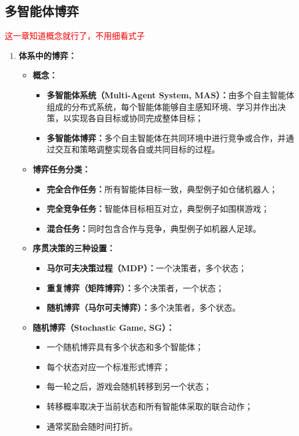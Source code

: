 \documentclass[../main.tex]{subfiles}
\begin{document}
\subsection{多智能体博弈}
\textcolor{red}{这一章知道概念就行了，不用细看式子}
\begin{enumerate}
    \item \textbf{体系中的博弈：}
    \begin{itemize}
        \item \textbf{概念：}
        \begin{itemize}
            \item \textbf{多智能体系统（Multi-Agent System, MAS）：}由多个自主智能体组成的分布式系统，每个智能体能够自主感知环境、学习并作出决策，以实现各自目标或协同完成整体目标；
            \item \textbf{多智能体博弈：}多个自主智能体在共同环境中进行竞争或合作，并通过交互和策略调整实现各自或共同目标的过程。
        \end{itemize}

        \item \textbf{博弈任务分类：}
        \begin{itemize}
            \item \textbf{完全合作任务：}所有智能体目标一致，典型例子如仓储机器人；
            \item \textbf{完全竞争任务：}智能体目标相互对立，典型例子如围棋游戏；
            \item \textbf{混合任务：}同时包含合作与竞争，典型例子如机器人足球。
        \end{itemize}

        \item \textbf{序贯决策的三种设置：}
        \begin{itemize}
            \item \textbf{马尔可夫决策过程（MDP）：}一个决策者，多个状态；
            \item \textbf{重复博弈（矩阵博弈）：}多个决策者，一个状态；
            \item \textbf{随机博弈（马尔可夫博弈）：}多个决策者，多个状态。
        \end{itemize}

        \item \textbf{随机博弈（Stochastic Game, SG）：}
        \begin{itemize}
            \item 一个随机博弈具有多个状态和多个智能体；
            \item 每个状态对应一个标准形式博弈；
            \item 每一轮之后，游戏会随机转移到另一个状态；
            \item 转移概率取决于当前状态和所有智能体采取的联合动作；
            \item 通常奖励会随时间打折。
        \end{itemize}


\end{itemize}
\end{enumerate}
\end{document}
